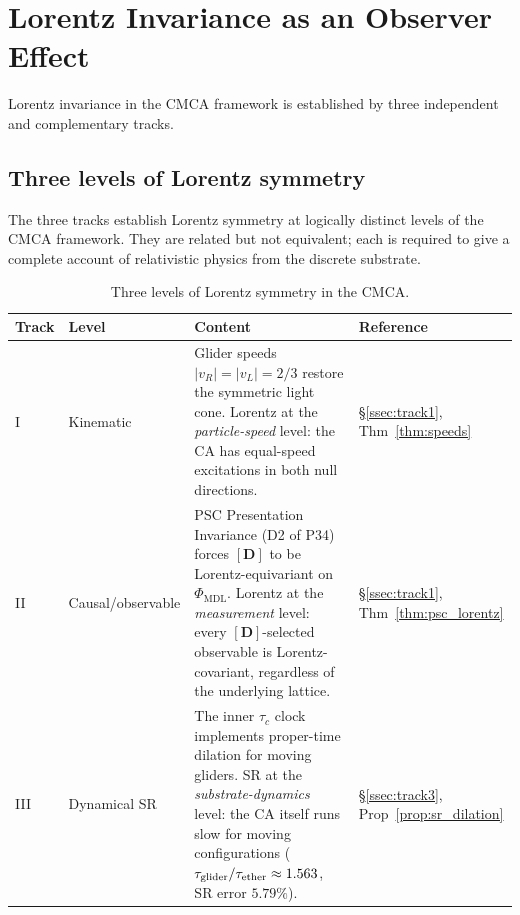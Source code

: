 \documentclass[11pt]{article}
\theoremstyle{remark}
\newcommand{\PHIMDL}{\Phi_{\mathrm{MDL}}}
\begin{document}
\section{Lorentz Invariance as an Observer Effect}
\label{sec:lorentz}

Lorentz invariance in the CMCA framework is established by three
independent and complementary tracks.

\subsection{Three levels of Lorentz symmetry}
\label{ssec:three_lorentz_levels}

The three tracks establish Lorentz symmetry at logically distinct levels
of the CMCA framework.  They are related but not equivalent; each is required
to give a complete account of relativistic physics from the discrete substrate.

\begin{table}[h]
  \centering
  \small
  \caption{Three levels of Lorentz symmetry in the CMCA.}
  \label{tab:three_lorentz}
  \begin{tabular}{p{1.6cm}p{2.5cm}p{4.8cm}p{2.3cm}}
    \toprule
    \textbf{Track} & \textbf{Level} & \textbf{Content} & \textbf{Reference} \\
    \midrule
    I & Kinematic & Glider speeds $|v_R|=|v_L|=2/3$ restore the
      symmetric light cone.  Lorentz at the \emph{particle-speed} level:
      the CA has equal-speed excitations in both null directions. &
      \S\ref{ssec:track1}, Thm~\ref{thm:speeds} \\
    \addlinespace
    II & Causal/\mbox{observable} & PSC Presentation Invariance (D2 of P34)
      forces $[\mathbf{D}]$ to be Lorentz-equivariant on $\PHIMDL$.
      Lorentz at the \emph{measurement} level: every $[\mathbf{D}]$-selected
      observable is Lorentz-covariant, regardless of the underlying lattice. &
      \S\ref{ssec:track1}, Thm~\ref{thm:psc_lorentz} \\
    \addlinespace
    III & Dynamical SR & The inner $\tau_c$ clock implements proper-time
      dilation for moving gliders.  SR at the \emph{substrate-dynamics} level:
      the CA itself runs slow for moving configurations ($\tau_{\rm glider}/
      \tau_{\rm ether}\approx1.563$, SR error $5.79\%$). &
      \S\ref{ssec:track3}, Prop~\ref{prop:sr_dilation} \\
    \bottomrule
  \end{tabular}
\end{table}
\end{document}
